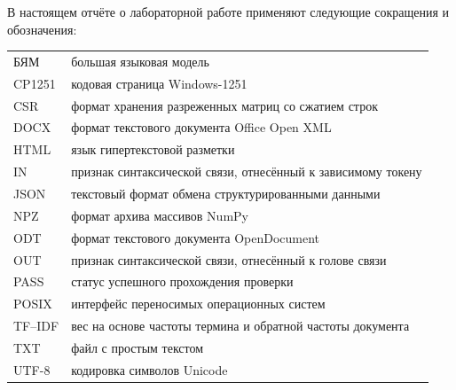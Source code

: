 В настоящем отчёте о лабораторной работе применяют следующие сокращения и обозначения:

\noindent
\begin{tabular}{@{}l@{\quad---\quad}p{}@{}}
БЯМ & большая языковая модель \\
CP1251 & кодовая страница Windows-1251 \\
CSR & формат хранения разреженных матриц со сжатием строк \\
DOCX & формат текстового документа Office Open XML \\
HTML & язык гипертекстовой разметки \\
IN & признак синтаксической связи, отнесённый к зависимому токену \\
JSON & текстовый формат обмена структурированными данными \\
NPZ & формат архива массивов NumPy \\
ODT & формат текстового документа OpenDocument \\
OUT & признак синтаксической связи, отнесённый к голове связи \\
PASS & статус успешного прохождения проверки \\
POSIX & интерфейс переносимых операционных систем \\
TF--IDF & вес на основе частоты термина и обратной частоты документа \\
TXT & файл с простым текстом \\
UTF-8 & кодировка символов Unicode
\end{tabular}




